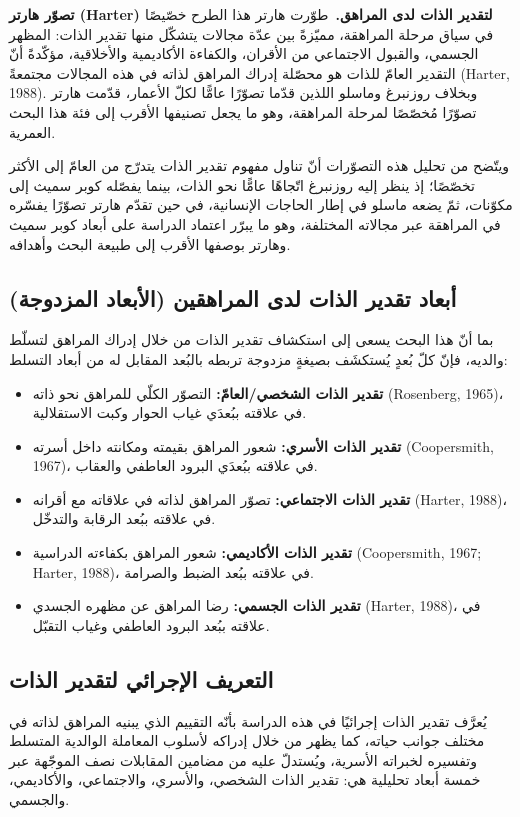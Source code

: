 \documentclass[12pt,oneside]{report}
\newcommand{\en}[1]{\textenglish{#1}}
\begin{document}
\noindent\textbf{تصوّر هارتر (Harter) لتقدير الذات لدى المراهق.}\ طوّرت هارتر هذا الطرح خصّيصًا في
سياق مرحلة المراهقة، مميّزةً بين عدّة مجالات يتشكّل منها تقدير الذات: المظهر الجسمي، والقبول
الاجتماعي من الأقران، والكفاءة الأكاديمية والأخلاقية، مؤكّدةً أنّ التقدير العامّ للذات هو محصّلة إدراك
المراهق لذاته في هذه المجالات مجتمعةً \en{(Harter, 1988)}. وبخلاف روزنبرغ وماسلو اللذين قدّما تصوّرًا
عامًّا لكلّ الأعمار، قدّمت هارتر تصوّرًا مُخصّصًا لمرحلة المراهقة، وهو ما يجعل تصنيفها الأقرب إلى فئة
هذا البحث العمرية.

ويتّضح من تحليل هذه التصوّرات أنّ تناول مفهوم تقدير الذات يتدرّج من العامّ إلى الأكثر تخصّصًا؛ إذ
ينظر إليه روزنبرغ اتّجاهًا عامًّا نحو الذات، بينما يفصّله كوبر سميث إلى مكوّنات، ثمّ يضعه ماسلو في إطار
الحاجات الإنسانية، في حين تقدّم هارتر تصوّرًا يفسّره في المراهقة عبر مجالاته المختلفة، وهو ما يبرّر
اعتماد الدراسة على أبعاد كوبر سميث وهارتر بوصفها الأقرب إلى طبيعة البحث وأهدافه.

\subsection{أبعاد تقدير الذات لدى المراهقين (الأبعاد المزدوجة)}
بما أنّ هذا البحث يسعى إلى استكشاف تقدير الذات من خلال إدراك المراهق لتسلّط والديه، فإنّ كلّ بُعدٍ
يُستكشَف بصيغةٍ مزدوجة تربطه بالبُعد المقابل له من أبعاد التسلط:
\begin{itemize}[leftmargin=1.6em,itemsep=1pt]
\item \textbf{تقدير الذات الشخصي/العامّ:} التصوّر الكلّي للمراهق نحو ذاته \en{(Rosenberg, 1965)}، في
علاقته ببُعدَي غياب الحوار وكبت الاستقلالية.
\item \textbf{تقدير الذات الأسري:} شعور المراهق بقيمته ومكانته داخل أسرته \en{(Coopersmith, 1967)}،
في علاقته ببُعدَي البرود العاطفي والعقاب.
\item \textbf{تقدير الذات الاجتماعي:} تصوّر المراهق لذاته في علاقاته مع أقرانه \en{(Harter, 1988)}، في
علاقته ببُعد الرقابة والتدخّل.
\item \textbf{تقدير الذات الأكاديمي:} شعور المراهق بكفاءته الدراسية \en{(Coopersmith, 1967; Harter,
1988)}، في علاقته ببُعد الضبط والصرامة.
\item \textbf{تقدير الذات الجسمي:} رضا المراهق عن مظهره الجسدي \en{(Harter, 1988)}، في علاقته ببُعد
البرود العاطفي وغياب التقبّل.
\end{itemize}

\subsection{التعريف الإجرائي لتقدير الذات}
يُعرَّف تقدير الذات إجرائيًا في هذه الدراسة بأنّه التقييم الذي يبنيه المراهق لذاته في مختلف جوانب حياته،
كما يظهر من خلال إدراكه لأسلوب المعاملة الوالدية المتسلط وتفسيره لخبراته الأسرية، ويُستدلّ عليه من
مضامين المقابلات نصف الموجّهة عبر خمسة أبعاد تحليلية هي: تقدير الذات الشخصي، والأسري،
والاجتماعي، والأكاديمي، والجسمي.
\end{document}
